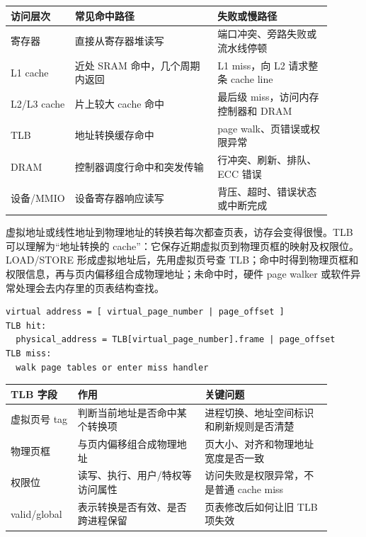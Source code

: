 \begin{longtable}{L{0.18\linewidth}L{0.4\linewidth}L{0.32\linewidth}}
\toprule
访问层次 & 常见命中路径 & 失败或慢路径 \\
\midrule
寄存器 & 直接从寄存器堆读写 & 端口冲突、旁路失败或流水线停顿 \\\tablerowrule
L1 cache & 近处 SRAM 命中，几个周期内返回 & L1 miss，向 L2 请求整条 cache line \\\tablerowrule
L2/L3 cache & 片上较大 cache 命中 & 最后级 miss，访问内存控制器和 DRAM \\\tablerowrule
TLB & 地址转换缓存命中 & page walk、页错误或权限异常 \\\tablerowrule
DRAM & 控制器调度行命中和突发传输 & 行冲突、刷新、排队、ECC 错误 \\\tablerowrule
设备/MMIO & 设备寄存器响应读写 & 背压、超时、错误状态或中断完成 \\
\bottomrule
\end{longtable}

虚拟地址或线性地址到物理地址的转换若每次都查页表，访存会变得很慢。TLB 可以理解为“地址转换的 cache”：它保存近期虚拟页到物理页框的映射及权限位。LOAD/STORE 形成虚拟地址后，先用虚拟页号查 TLB；命中时得到物理页框和权限信息，再与页内偏移组合成物理地址；未命中时，硬件 page walker 或软件异常处理会去内存里的页表结构查找。

\begin{lstlisting}
virtual address = [ virtual_page_number | page_offset ]
TLB hit:
  physical_address = TLB[virtual_page_number].frame | page_offset
TLB miss:
  walk page tables or enter miss handler
\end{lstlisting}

\begin{longtable}{L{0.18\linewidth}L{0.36\linewidth}L{0.36\linewidth}}
\toprule
TLB 字段 & 作用 & 关键问题 \\
\midrule
虚拟页号 tag & 判断当前地址是否命中某个转换项 & 进程切换、地址空间标识和刷新规则是否清楚 \\\tablerowrule
物理页框 & 与页内偏移组合成物理地址 & 页大小、对齐和物理地址宽度是否一致 \\\tablerowrule
权限位 & 读写、执行、用户/特权等访问属性 & 访问失败是权限异常，不是普通 cache miss \\\tablerowrule
valid/global & 表示转换是否有效、是否跨进程保留 & 页表修改后如何让旧 TLB 项失效 \\
\bottomrule
\end{longtable}

